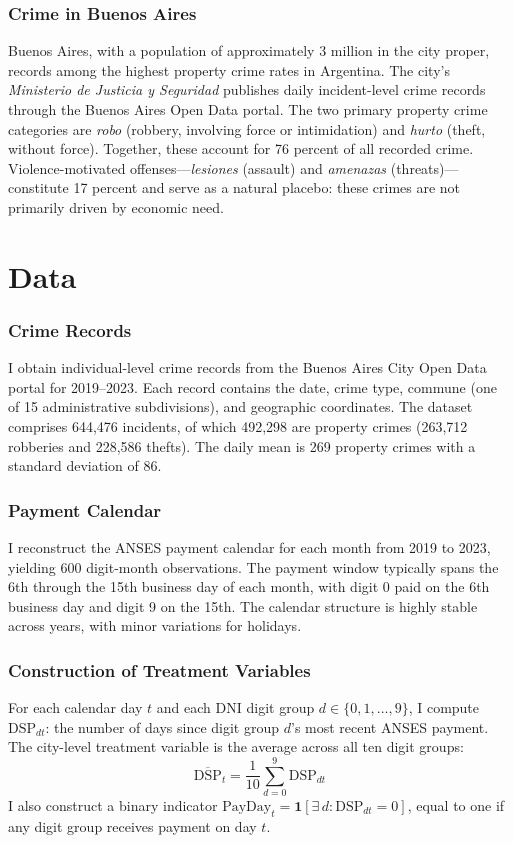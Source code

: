 \documentclass[12pt]{article}
\begin{document}
\subsubsection*{Crime in Buenos Aires} Buenos Aires, with a population of approximately 3 million in the city proper, records among the highest property crime rates in Argentina. The city's \textit{Ministerio de Justicia y Seguridad} publishes daily incident-level crime records through the Buenos Aires Open Data portal. The two primary property crime categories are \textit{robo} (robbery, involving force or intimidation) and \textit{hurto} (theft, without force). Together, these account for 76 percent of all recorded crime. Violence-motivated offenses---\textit{lesiones} (assault) and \textit{amenazas} (threats)---constitute 17 percent and serve as a natural placebo: these crimes are not primarily driven by economic need.


\section{Data}
\label{sec:data}

\subsubsection*{Crime Records} I obtain individual-level crime records from the Buenos Aires City Open Data portal for 2019--2023. Each record contains the date, crime type, commune (one of 15 administrative subdivisions), and geographic coordinates. The dataset comprises 644,476 incidents, of which 492,298 are property crimes (263,712 robberies and 228,586 thefts). The daily mean is 269 property crimes with a standard deviation of 86.

\subsubsection*{Payment Calendar} I reconstruct the ANSES payment calendar for each month from 2019 to 2023, yielding 600 digit-month observations. The payment window typically spans the 6th through the 15th business day of each month, with digit 0 paid on the 6th business day and digit 9 on the 15th. The calendar structure is highly stable across years, with minor variations for holidays.

\subsubsection*{Construction of Treatment Variables} For each calendar day $t$ and each DNI digit group $d \in \{0, 1, \ldots, 9\}$, I compute $\text{DSP}_{dt}$: the number of days since digit group $d$'s most recent ANSES payment. The city-level treatment variable is the average across all ten digit groups:
\begin{equation}
\overline{\text{DSP}}_t = \frac{1}{10} \sum_{d=0}^{9} \text{DSP}_{dt}
\end{equation}
I also construct a binary indicator $\text{PayDay}_t = \mathbf{1}[\exists\, d : \text{DSP}_{dt} = 0]$, equal to one if any digit group receives payment on day $t$.
\end{document}
